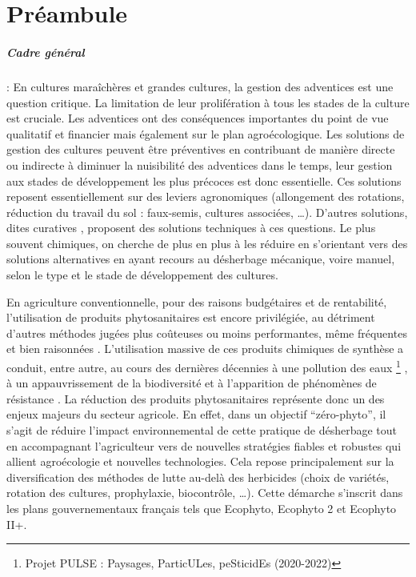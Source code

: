 \documentclass[../thesis.tex]{subfiles}
\begin{document}
    \chapter*{Préambule}
    \label{chap:01-preamble}
    \thispagestyle{empty} 
    
    
    \paragraph{Cadre général} : En cultures maraîchères et grandes cultures, la gestion des adventices est une question critique. La limitation de leur prolifération à tous les stades de la culture est cruciale. Les adventices ont des conséquences importantes du point de vue qualitatif et financier mais également sur le plan agroécologique. Les solutions de gestion des cultures peuvent être préventives en contribuant de manière directe ou indirecte à diminuer la nuisibilité des adventices \cite{caussanel:hal-00885190} dans le temps, leur gestion aux stades de développement les plus précoces est donc essentielle. Ces solutions reposent essentiellement sur des leviers agronomiques (allongement des rotations, réduction du travail du sol : faux-semis, cultures associées, \dots). D'autres solutions, dites curatives \cite{cordeau:hal-01604468}, proposent des solutions techniques à ces questions. Le plus souvent chimiques, on cherche de plus en plus à les réduire en s'orientant vers des solutions alternatives en ayant recours au désherbage mécanique, voire manuel, selon le type et le stade de développement des cultures.
    
    \par En agriculture conventionnelle, pour des raisons budgétaires et de rentabilité, l'utilisation de produits phytosanitaires est encore privilégiée, au détriment d'autres méthodes jugées plus coûteuses ou moins performantes, même fréquentes et bien raisonnées \cite{COLBACH2010205}. L'utilisation massive de ces produits chimiques de synthèse a conduit, entre autre, au cours des dernières décennies à une pollution des eaux \footnote{Projet PULSE : Paysages, ParticULes, peSticidEs (2020-2022)} \cite{reulier:tel-01264723}, à un appauvrissement de la biodiversité \cite{jonathan-storkey} et à l'apparition de phénomènes de résistance \cite{delye:hal-02736186}. La réduction des produits phytosanitaires représente donc un des enjeux majeurs du secteur agricole. En effet, dans un objectif  ``zéro-phyto'', il s'agit de réduire l'impact environnemental de cette pratique de désherbage tout en accompagnant l'agriculteur vers de nouvelles stratégies fiables et robustes qui allient agroécologie et nouvelles technologies. Cela repose principalement sur la diversification des méthodes de lutte \cite{Wezel2014} au-delà des herbicides (choix de variétés, rotation des cultures, prophylaxie, biocontrôle, \dots). Cette démarche s'inscrit dans les plans gouvernementaux français tels que Ecophyto, Ecophyto 2 et Ecophyto II+.
    
\end{document}
